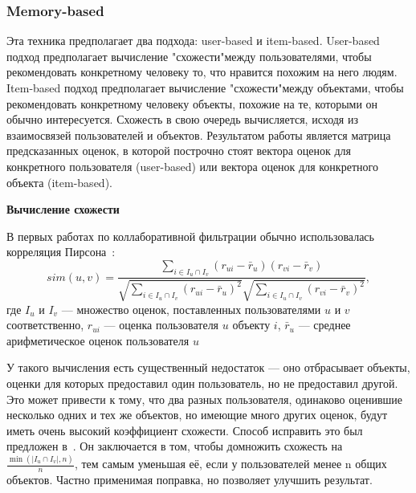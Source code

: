 \subsubsection{Memory-based}
Эта техника предполагает два подхода: user-based и item-based.
User-based подход предполагает вычисление "схожести"\space между пользователями, чтобы рекомендовать конкретному человеку то, что нравится похожим на него людям.
Item-based подход предполагает вычисление "схожести"\space между объектами, чтобы рекомендовать конкретному человеку объекты, похожие на те, которыми он обычно интересуется.
Схожесть в свою очередь вычисляется, исходя из взаимосвязей пользователей и объектов.
Результатом работы является матрица предсказанных оценок, в которой построчно стоят вектора оценок для конкретного пользователя (user-based) или вектора оценок для конкретного объекта (item-based).

\vspace{1em}
\textbf{Вычисление схожести}

В первых работах по коллаборативной фильтрации обычно использовалась корреляция Пирсона~\cite{resnick}:
\begin{equation}\label{eq:pearson}
    sim(u, v) = \frac
    {\sum_{i\in I_u\cap I_v}{(r_{ui} - \bar r_u)(r_{vi} - \bar r_v)}}
    {\sqrt{\sum_{i \in I_u \cap I_v}{(r_{ui} - \bar r_u)^2}}
    \sqrt{\sum_{i \in I_u \cap I_v}{(r_{vi} - \bar r_v)^2}}},
\end{equation}
где $I_u$ и $I_v$ --- множество оценок, поставленных пользователями $u$ и $v$ соответственно,
$r_{ui}$ --- оценка пользователя $u$ объекту $i$,
$\bar r_u$ --- среднее арифметическое оценок пользователя $u$

У такого вычисления есть существенный недостаток --- оно отбрасывает объекты, оценки для которых предоставил один пользователь, но не предоставил другой.
Это может привести к тому, что два разных пользователя, одинаково оценившие несколько одних и тех же объектов, но имеющие много других оценок, будут иметь очень высокий коэффициент схожести.
Способ исправить это был предложен в~\cite{herlocker}.
Он заключается в том, чтобы домножить схожесть на $\frac{\min(\mid I_u \cap I_v\mid, n)}{n}$, тем самым уменьшая её, если у пользователей менее n общих объектов.
Частно применимая поправка, но позволяет улучшить результат.

